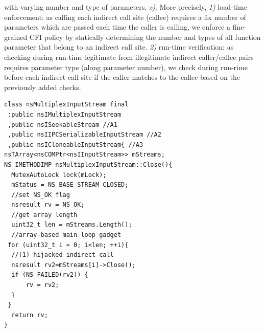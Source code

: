with varying number and type of parameters, \textit{x)}.
More precisely, 
\textit{1)} load-time enforcement: as calling each indirect call site (callee) requires 
a fix number of parameters which are passed each time the caller is calling, we
enforce a fine-grained CFI policy by statically determining the number and types of all function parameter
that belong to an indirect call site.
\textit{2)} run-time verification: as checking during run-time legitimate from
illegitimate indirect caller/callee pairs requires parameter type (along parameter number),
we check during run-rime before each indirect call-site if the caller matches to the callee 
based on the previously added checks.

\newsavebox{\firstlisting}
\begin{lrbox}{\firstlisting}
\begin{minipage}[c]{0.4\linewidth}
\begin{verbatim}
class nsMultiplexInputStream final 
 :public nsIMultiplexInputStream 
 ,public nsISeekableStream //A1
 ,public nsIIPCSerializableInputStream //A2
 ,public nsICloneableInputStream{ //A3
nsTArray<nsCOMPtr<nsIInputStream>> mStreams;
NS_IMETHODIMP nsMultiplexInputStream::Close(){
  MutexAutoLock lock(mLock);
  mStatus = NS_BASE_STREAM_CLOSED;
  //set NS_OK flag
  nsresult rv = NS_OK;
  //get array length
  uint32_t len = mStreams.Length();
  //array-based main loop gadget
 for (uint32_t i = 0; i<len; ++i){
  //(1) hijacked indirect call
  nsresult rv2=mStreams[i]->Close();
  if (NS_FAILED(rv2)) {
      rv = rv2;
  }
 }
  return rv;
}
\end{verbatim}
\end{minipage}
\end{lrbox}

